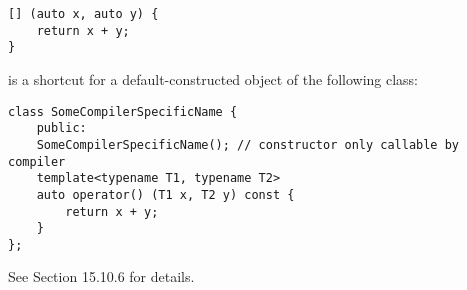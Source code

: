 \begin{lstlisting}[style=styleCXX]
[] (auto x, auto y) {
	return x + y;
}
\end{lstlisting}

is a shortcut for a default-constructed object of the following class:

\begin{lstlisting}[style=styleCXX]
class SomeCompilerSpecificName {
	public:
	SomeCompilerSpecificName(); // constructor only callable by compiler
	template<typename T1, typename T2>
	auto operator() (T1 x, T2 y) const {
		return x + y;
	}
};
\end{lstlisting}

See Section 15.10.6 for details.







